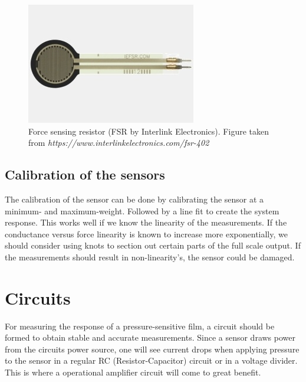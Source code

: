 \begin{figure}
    \centering
    \includegraphics[scale=0.85]{figures/FSR-402.jpg}
    \caption{Force sensing resistor (FSR by Interlink Electronics). Figure taken from \textit{https://www.interlinkelectronics.com/fsr-402}}
    \label{fig:fsr402}
\end{figure}

\subsection{Calibration of the sensors}
\label{subsec:calibration}
The calibration of the sensor can be done by calibrating the sensor at a minimum- and maximum-weight. Followed by a line fit to create the system response. This works well if we know the linearity of the measurements. If the conductance versus force linearity is known to increase more exponentially, we should consider using knots to section out certain parts of the full scale output. If the measurements should result in non-linearity's, the sensor could be damaged.

\section{Circuits}
\label{sec:circuits}
For measuring the response of a pressure-sensitive film, a circuit should be formed to obtain stable and accurate measurements. Since a sensor draws power from the circuits power source, one will see current drops when applying pressure to the sensor in a regular RC (Resistor-Capacitor) circuit or in a voltage divider. This is where a operational amplifier circuit will come to great benefit.

